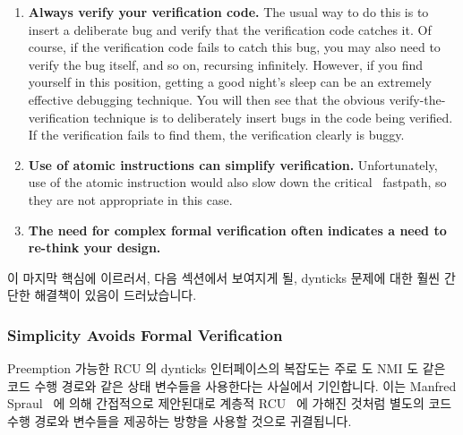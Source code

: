 \begin{enumerate}
\item	{\bf Always verify your verification code.}
	The usual way to do this is to insert a deliberate bug
	and verify that the verification code catches it.  Of course,
	if the verification code fails to catch this bug, you may also
	need to verify the bug itself, and so on, recursing infinitely.
	However, if you find yourself in this position,
	getting a good night's sleep
	can be an extremely effective debugging technique.
	You will then see that the obvious verify-the-verification
	technique is to deliberately insert bugs in the code being
	verified.
	If the verification fails to find them, the verification clearly
	is buggy.
\item	{\bf Use of atomic instructions can simplify verification.}
	Unfortunately, use of the  atomic instruction
	would also slow down the critical \IRQ\ fastpath, so they
	are not appropriate in this case.
\item	{\bf The need for complex formal verification often indicates
	a need to re-think your design.}
\fi
\end{enumerate}

이 마지막 핵심에 이르러서, 다음 섹션에서 보여지게 될, dynticks 문제에 대한 훨씬
간단한 해결책이 있음이 드러났습니다.
\iffalse

To this last point, it turn out that there is a much simpler solution to
the dynticks problem, which is presented in the next section.
\fi

\subsubsection{Simplicity Avoids Formal Verification}
\label{sec:formal:Simplicity Avoids Formal Verification}

Preemption 가능한 RCU 의 dynticks 인터페이스의 복잡도는 주로 \IRQ 도 NMI 도 같은
코드 수행 경로와 같은 상태 변수들을 사용한다는 사실에서 기인합니다.
이는
Manfred Spraul~\cite{ManfredSpraul2008StateMachineRCU} 에 의해 간접적으로
제안된대로 계층적 RCU~\cite{PaulEMcKenney2008HierarchicalRCU} 에 가해진 것처럼
별도의 코드 수행 경로와 변수들을 제공하는 방향을 사용할 것으로 귀결됩니다.
\iffalse

The complexity of the dynticks interface for preemptible RCU is primarily
due to the fact that both \IRQ s and NMIs use the same code path and the
same state variables.
This leads to the notion of providing separate code paths and variables
for \IRQ s and NMIs, as has been done for
hierarchical RCU~\cite{PaulEMcKenney2008HierarchicalRCU}
as indirectly suggested by
Manfred Spraul~\cite{ManfredSpraul2008StateMachineRCU}.
\fi

